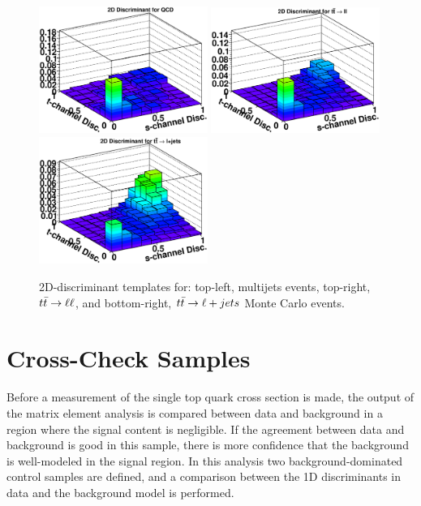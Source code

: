\begin{figure}[!h!tbp]
\includegraphics[width=0.49\textwidth]
{eps/MatrixElement/performance/2D-Discriminant_qcd}
\includegraphics[width=0.49\textwidth]
{eps/MatrixElement/performance/2D-Discriminant_dilepton}
\includegraphics[width=0.49\textwidth]
{eps/MatrixElement/performance/2D-Discriminant_lepjets}
\vspace{-0.1in}
\caption{2D-discriminant templates for: top-left,
multijets events, top-right, $\mbox{$t\bar{t}$} \rightarrow \ell \ell$, and bottom-right, $\mbox{$t\bar{t}$} \rightarrow \ell + jets$ Monte
Carlo events.}
\label{qcdtt}
\end{figure}


\clearpage
\section{Cross-Check Samples}
\label{crosscheck}

Before a measurement of the single top quark cross section is made, the output of the matrix element analysis is compared between data and background in a region where the signal content is negligible. If the agreement between data and background is good in this sample, there is more confidence that the background is well-modeled in the signal region. In this analysis two background-dominated control
samples are defined, and a comparison between the 1D discriminants in
data and the background model is performed.

